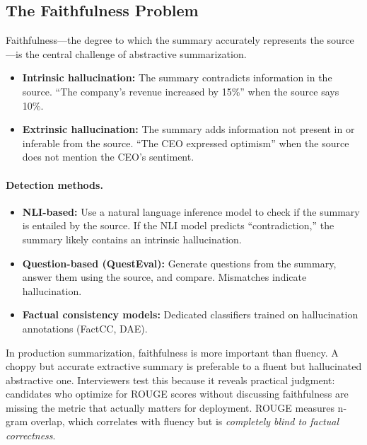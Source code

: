 \subsection{The Faithfulness Problem}

Faithfulness---the degree to which the summary accurately represents the source---is the
central challenge of abstractive summarization.

\begin{itemize}
    \item \textbf{Intrinsic hallucination:} The summary contradicts information in the source.
          ``The company's revenue increased by 15\%'' when the source says 10\%.
    \item \textbf{Extrinsic hallucination:} The summary adds information not present in or
          inferable from the source.  ``The CEO expressed optimism'' when the source does not
          mention the CEO's sentiment.
\end{itemize}

\paragraph{Detection methods.}
\begin{itemize}
    \item \textbf{NLI-based:} Use a natural language inference model to check if the summary
          is entailed by the source.  If the NLI model predicts ``contradiction,'' the summary
          likely contains an intrinsic hallucination.
    \item \textbf{Question-based (QuestEval):} Generate questions from the summary, answer
          them using the source, and compare.  Mismatches indicate hallucination.
    \item \textbf{Factual consistency models:} Dedicated classifiers trained on hallucination
          annotations (FactCC, DAE).
\end{itemize}

\begin{keyinsight}
In production summarization, faithfulness is more important than fluency.  A choppy but
accurate extractive summary is preferable to a fluent but hallucinated abstractive one.
Interviewers test this because it reveals practical judgment: candidates who optimize for
ROUGE scores without discussing faithfulness are missing the metric that actually matters
for deployment.  ROUGE measures n-gram overlap, which correlates with fluency but is
\emph{completely blind to factual correctness}.
\end{keyinsight}

